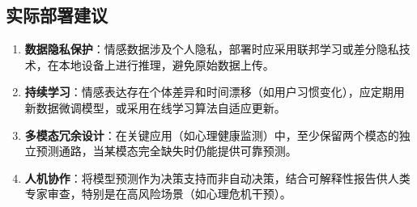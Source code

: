 \subsection{实际部署建议}

\begin{enumerate}
\item \textbf{数据隐私保护}：情感数据涉及个人隐私，部署时应采用联邦学习或差分隐私技术，在本地设备上进行推理，避免原始数据上传。
\item \textbf{持续学习}：情感表达存在个体差异和时间漂移（如用户习惯变化），应定期用新数据微调模型，或采用在线学习算法自适应更新。
\item \textbf{多模态冗余设计}：在关键应用（如心理健康监测）中，至少保留两个模态的独立预测通路，当某模态完全缺失时仍能提供可靠预测。
\item \textbf{人机协作}：将模型预测作为决策支持而非自动决策，结合可解释性报告供人类专家审查，特别是在高风险场景（如心理危机干预）。
\end{enumerate}
